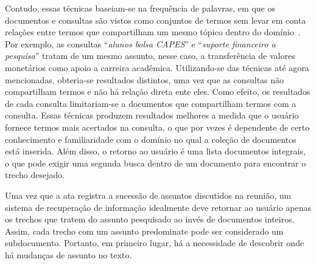 Contudo, essas técnicas baseiam-se na frequência de palavras, em que os documentos e consultas são vistos como conjuntos de termos sem levar em conta relações entre termos que compartilham um mesmo tópico dentro do domínio~\cite{WEIXING}. Por exemplo, as consultas ``\textit{alunos bolsa CAPES}'' e ``\textit{suporte financeiro a pesquisa}'' tratam de um mesmo assunto, nesse caso, a transferência de valores monetários como apoio a carreira acadêmica. Utilizando-se das técnicas até agora mencionadas, obteria-se resultados distintos, uma vez que as consultas não compartilham termos e não há relação direta ente eles. Como efeito, os resultados de cada consulta limitariam-se a documentos que compartilham termos com a consulta.
Essas técnicas produzem resultados melhores a medida que o usuário fornece termos mais acertados na consulta, o que por vezes é dependente de certo conhecimento e familiaridade com o domínio no qual a coleção de documentos está inserida. Além disso, o retorno ao usuário é uma lista documentos integrais, o que pode exigir uma segunda busca dentro de um documento para encontrar o trecho desejado.





% 
% 
Uma vez que a ata registra a sucessão de assuntos discutidos na reunião, um sistema de recuperação de informação idealmente deve retornar ao usuário apenas os trechos que tratem do assunto pesquisado ao invés de documentos inteiros. Assim, cada trecho com um assunto predominate pode ser considerado um subdocumento. Portanto, em primeiro lugar, há a necessidade de descobrir onde há mudanças de assunto no texto. 




